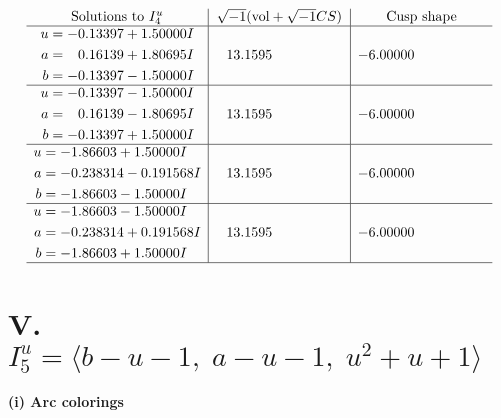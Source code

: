 \documentclass[1p]{elsarticle_modified}
\theoremstyle{definition}
\newcommand{\I}{\sqrt{-1}}
\begin{document}
$$\begin{array}{c|c|c}  
\text{Solutions to }I^u_{4}& \I (\text{vol} + \sqrt{-1}CS) & \text{Cusp shape}\\
 \hline 
\begin{aligned}
u &= -0.13397 + 1.50000 I \\
a &= \phantom{-}0.16139 + 1.80695 I \\
b &= -0.13397 - 1.50000 I\end{aligned}
 & \phantom{-}13.1595\phantom{ +0.000000I} & -6.00000\phantom{ +0.000000I} \\ \hline\begin{aligned}
u &= -0.13397 - 1.50000 I \\
a &= \phantom{-}0.16139 - 1.80695 I \\
b &= -0.13397 + 1.50000 I\end{aligned}
 & \phantom{-}13.1595\phantom{ +0.000000I} & -6.00000\phantom{ +0.000000I} \\ \hline\begin{aligned}
u &= -1.86603 + 1.50000 I \\
a &= -0.238314 - 0.191568 I \\
b &= -1.86603 - 1.50000 I\end{aligned}
 & \phantom{-}13.1595\phantom{ +0.000000I} & -6.00000\phantom{ +0.000000I} \\ \hline\begin{aligned}
u &= -1.86603 - 1.50000 I \\
a &= -0.238314 + 0.191568 I \\
b &= -1.86603 + 1.50000 I\end{aligned}
 & \phantom{-}13.1595\phantom{ +0.000000I} & -6.00000\phantom{ +0.000000I}\\
 \hline 
 \end{array}$$\newpage\newpage\renewcommand{\arraystretch}{1}
\centering \section*{V. $I^u_{5}= \langle b- u-1,\;a- u-1,\;u^2+u+1 \rangle$}
\flushleft \textbf{(i) Arc colorings}\\
\end{document}
